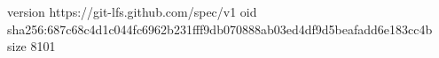version https://git-lfs.github.com/spec/v1
oid sha256:687c68c4d1c044fc6962b231fff9db070888ab03ed4df9d5beafadd6e183cc4b
size 8101
